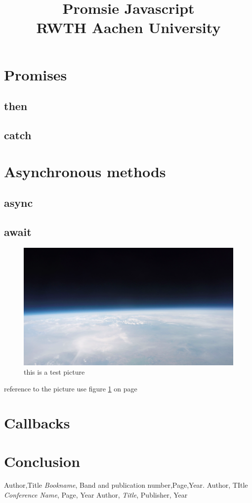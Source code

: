 \documentclass[11pt,a4paper,onecolumn]{IEEEtran}
\title{Promsie Javascript\\
{\footnotesize RWTH Aachen University}}
\author{
  \IEEEauthorblockN{1\textsuperscript{st} Papop Lekhapanyaporn}
  \and
  \IEEEauthorblockN{2\textsuperscript{nd} Tobias Piatek}
  \and
  \IEEEauthorblockN{3\textsuperscript{rd} Tobias Waerder}
  }
\begin{document}
\maketitle
\begin{abstract}
  \lipsum[1]
\end{abstract}
\section{Promises}
\lipsum[2]
\subsection{then}
\lipsum[3]
\subsection{catch}
\lipsum[4]
\section{Asynchronous methods}
\lipsum[4-6]
\subsection{async}
\lipsum[3]
\subsection{await}
\lipsum[4]
\begin{figure}
  \centering
  \includegraphics[scale=0.1]{test}
  \caption{this is a test picture}
  \label{fig:test}
\end{figure}

reference to the picture use figure \ref{fig:test} on page \pageref{fig:test}
\section{Callbacks}
\lipsum[4-6]
\section{Conclusion}
\lipsum[4-6]
\begin{thebibliography}{9}
   Author,Title \emph{Bookname}, Band and publication number,Page,Year.
   Author, TItle \emph{Conference Name}, Page, Year
   Author, \emph{Title}, Publisher, Year
\end{thebibliography}
\end{document}
